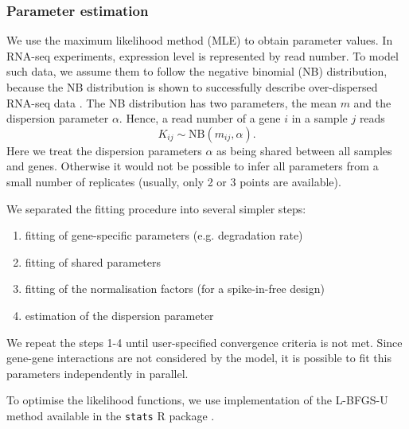 \subsubsection*{Parameter estimation}
We use the maximum likelihood method (MLE) to obtain parameter values.
In RNA-seq experiments, expression level is represented by read number.
To model such data, we assume them to follow the negative binomial (NB) distribution, 
because the NB distribution is  shown to successfully describe over-dispersed RNA-seq data 
\citep{robinson2007moderated}.
The NB distribution has two parameters, the mean $m$ and the dispersion parameter 
$\alpha$.
Hence,  a read number of a gene $i$ in a sample $j$ reads
\begin{equation}
 K_{ij} \sim \text{NB}(m_{ij}, \alpha).
\end{equation}
Here we treat the  dispersion parameters $\alpha$ as  being shared between all
samples and genes. Otherwise it would not be possible to infer all parameters 
from a small number of replicates (usually, only 2 or 3 points are available).


We separated the fitting procedure into several simpler steps:
\begin{enumerate}
 \item fitting of gene-specific parameters (e.g. degradation rate)
 \item fitting of shared parameters  
 \item fitting of the normalisation factors (for a spike-in-free design)
 \item estimation of the dispersion parameter 
\end{enumerate}
We repeat the steps 1-4 until
user-specified convergence criteria is not met.
 Since gene-gene interactions are not considered by the model, it is possible to 
 fit this parameters independently in parallel. 

To optimise the likelihood functions, 
we use implementation of the {L-BFGS-U} method \citep{byrd1995limited} 
available in the \verb|stats| R package \citep{rlang}.